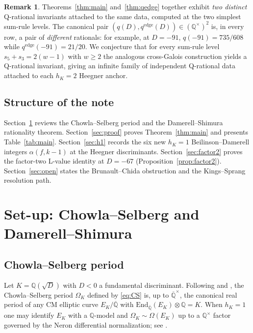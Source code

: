 \documentclass[11pt,a4paper]{amsart}
\theoremstyle{plain}
\theoremstyle{definition}
\newtheorem{remark}[theorem]{Remark}
\newcommand{\Q}{\mathbb{Q}}
\newcommand{\End}{\mathrm{End}}
\begin{document}
\begin{remark}\label{rk:two-invariant}
Theorems~\ref{thm:main} and~\ref{thm:qedge} together exhibit
\emph{two distinct} Q-rational invariants attached to the same
data, computed at the two simplest sum-rule levels. The
canonical pair $(q(D), q^{\mathrm{edge}}(D)) \in (\Q^{\times})^2$
is, in every row, a pair of \emph{different} rationals: for example,
at $D = -91$, $q(-91) = 735/608$ while
$q^{\mathrm{edge}}(-91) = 21/20$. We conjecture that for every
sum-rule level $s_5 + s_3 = 2(w-1)$ with $w \ge 2$ the analogous
cross-Galois construction yields a Q-rational invariant, giving an
infinite family of independent Q-rational data attached to each
$h_K = 2$ Heegner anchor.
\end{remark}

\subsection{Structure of the note}

Section~\ref{sec:setup} reviews the Chowla--Selberg period and the
Damerell--Shimura rationality theorem. Section~\ref{sec:proof} proves
Theorem~\ref{thm:main} and presents Table~\ref{tab:main}.
Section~\ref{sec:h1} records the six new $h_K=1$ Beilinson--Damerell
integers $\alpha(f,k-1)$ at the Heegner discriminants.
Section~\ref{sec:factor2} proves the factor-two L-value identity at $D=-67$
(Proposition~\ref{prop:factor2}). Section~\ref{sec:open} states the
Brunault--Chida obstruction and the Kings--Sprang resolution path.

\section{Set-up: Chowla--Selberg and Damerell--Shimura}
\label{sec:setup}

\subsection{Chowla--Selberg period}

Let $K=\Q(\sqrt{D})$ with $D<0$ a fundamental discriminant. Following
\cite[\S2]{ChowlaSelberg1949} and \cite[\S0]{Shimura1976}, the
Chowla--Selberg period $\Omega_K$ defined by \eqref{eq:CS} is, up to
$\overline{\Q}^{\times}$, the canonical real period of any CM elliptic
curve $E_K/\overline{\Q}$ with $\End_{\overline{\Q}}(E_K)\otimes\Q = K$.
When $h_K=1$ one may identify $E_K$ with a $\Q$-model and
$\Omega_K\sim\Omega(E_K)$ up to a $\Q^{\times}$ factor governed by the
Neron differential normalization; see \cite[\S1]{Gross1980}.
\end{document}
